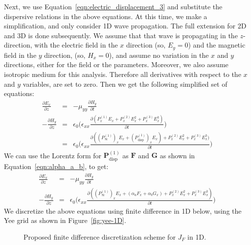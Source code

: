 \documentclass{article}[12pt]
\theoremstyle{plain}
\begin{document}
Next, we use Equation~\ref{eqn:electric_displacement_3} and substitute the dispersive relations in the
above equations. At this time, we make a simplification, and only consider 1D wave propagation. The full extension
for 2D and 3D is done subsequently. We assume that that wave is propagating in the $z$-direction, 
with the electric field in the $x$ direction (so, $E_y=0$) and the magnetic field in the $y$ direction,
(so, $H_x=0$),
and assume no
variation in the $x$ and $y$ directions, either for the field or the parameters. Moreover, we also assume
isotropic medium for this analysis.
Therefore all derivatives with respect to the $x$ and $y$ variables, are set to zero. Then we get the following
simplified set of equations:
\begin{eqnarray}
\frac{\partial E_x}{\partial z} & = & - \mu_{yy} \frac{\partial H_y}{\partial t} \\
- \frac{\partial H_y}{\partial z} & = & \epsilon_0 \Big( \epsilon_{xx} \frac{\partial (P^{(1)}_xE_x+P^{(2)}_xE^2_x+P^{(3)}_xE^3_x)}{\partial t} \Big) \\
& = & \epsilon_0 \Big( \epsilon_{xx}\frac{\partial ((P^{(1)}_\infty)_xE_x+(P^{(1)}_\mathrm{disp})_xE_x)+P^{(2)}_xE^2_x+P^{(3)}_xE^3_x)}{\partial t} \Big) 
\end{eqnarray}
We can use the Lorentz form for $\mathbf{P}^{(1)}_\mathrm{disp}$ as $\mathbf{F}$ and $\mathbf{G}$ as shown in
Equation~\ref{eqn:alpha_a_b}, to get:
\begin{eqnarray}
\frac{\partial E_x}{\partial z} & = & - \mu_{yy} \frac{\partial H_y}{\partial t} \\
- \frac{\partial H_y}{\partial z} & = & \epsilon_0 \Big( \epsilon_{xx}\frac{\partial ((P^{(1)}_\infty)_xE_x+(\alpha_aF_x+\alpha_bG_x)+P^{(2)}_xE^2_x+P^{(3)}_xE^3_x)}{\partial t} \Big) 
\end{eqnarray}
We discretize the above equations using finite difference in 1D below, using the Yee
grid as shown in Figure~\ref{fig:yee-1D}.

\begin{figure}
\begin{center}
\caption{Proposed finite difference discretization scheme for $J_F$ in 1D.}
\label{fig:1D-scheme}
\end{center}
\end{figure}
\end{document}
